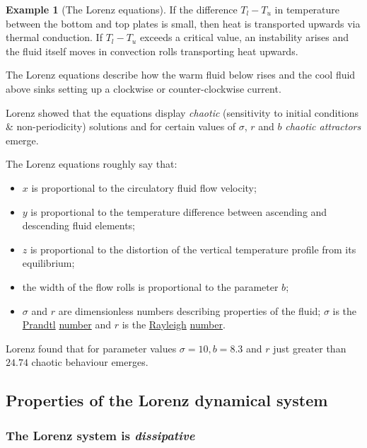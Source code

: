 \documentclass[
  a4paper,
  oneside,
  final]{krantz}
\providecommand{\tightlist}{%
  \setlength{\itemsep}{0pt}\setlength{\parskip}{0pt}}
\theoremstyle{definition}
\theoremstyle{definition}
\newtheorem{example}{Example}[chapter]
\theoremstyle{definition}
\theoremstyle{definition}
\theoremstyle{remark}
\begin{document}
\begin{example}[The Lorenz equations]
If the difference \(T_{l} - T_{u}\) in temperature between the bottom and top plates is small, then heat is transported upwards via thermal conduction. If \(T_{l} - T_{u}\) exceeds a critical value, an instability arises and the fluid itself moves in convection rolls transporting heat upwards.

The Lorenz equations describe how the warm fluid below rises and the cool fluid above sinks setting up a clockwise or counter-clockwise current.

Lorenz showed that the equations display \emph{chaotic} (sensitivity to initial conditions \& non-periodicity) solutions and for certain values of \(\sigma\), \(r\) and \(b\) \emph{chaotic attractors} emerge.

The Lorenz equations roughly say that:

\begin{itemize}
\tightlist
\item
  \(x\) is proportional to the circulatory fluid flow velocity;
\item
  \(y\) is proportional to the temperature difference between ascending and descending fluid elements;
\item
  \(z\) is proportional to the distortion of the vertical temperature profile from its equilibrium;
\item
  the width of the flow rolls is proportional to the parameter \(b\);
\item
  \(\sigma\) and \(r\) are dimensionless numbers describing properties of the fluid; \(\sigma\) is the \href{https://mathshistory.st-andrews.ac.uk/Biographies/Prandtl/}{Prandtl} \href{https://en.wikipedia.org/wiki/Prandtl_number}{number} and \(r\) is the \href{https://mathshistory.st-andrews.ac.uk/Biographies/Rayleigh/}{Rayleigh} \href{https://en.wikipedia.org/wiki/Rayleigh_number}{number}.
\end{itemize}

Lorenz found that for parameter values \(\sigma = 10, b= 8.3\) and \(r\) just greater than \(24.74\) chaotic behaviour emerges.
\end{example}

\hypertarget{properties-of-the-lorenz-dynamical-system}{%
\subsection{Properties of the Lorenz dynamical system}\label{properties-of-the-lorenz-dynamical-system}}

\hypertarget{the-lorenz-system-is-dissipative}{%
\subsubsection*{\texorpdfstring{The Lorenz system is \emph{dissipative}}{The Lorenz system is dissipative}}\label{the-lorenz-system-is-dissipative}}
\end{document}
